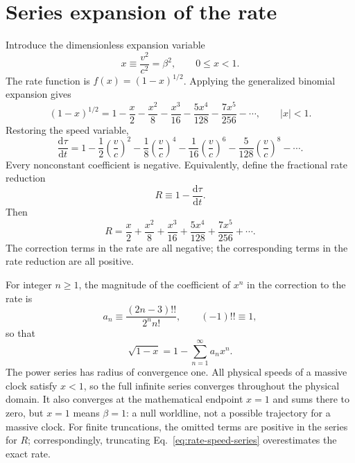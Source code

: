 \documentclass[12pt]{article}
\begin{document}
\section{Series expansion of the rate}

Introduce the dimensionless expansion variable
\begin{equation}
  x\equiv\frac{v^2}{c^2}=\beta^2,
  \qquad 0\leq x<1.
  \label{eq:x-definition}
\end{equation}
The rate function is $f(x)=(1-x)^{1/2}$. Applying the generalized binomial expansion \cite{DLMF} gives
\begin{equation}
  (1-x)^{1/2}
  =1-\frac{x}{2}-\frac{x^2}{8}-\frac{x^3}{16}
    -\frac{5x^4}{128}-\frac{7x^5}{256}-\cdots,
  \qquad |x|<1.
  \label{eq:rate-series}
\end{equation}
Restoring the speed variable,
\begin{equation}
  \frac{\mathrm{d}\tau}{\mathrm{d}t}
  =1-\frac{1}{2}\left(\frac{v}{c}\right)^2
    -\frac{1}{8}\left(\frac{v}{c}\right)^4
    -\frac{1}{16}\left(\frac{v}{c}\right)^6
    -\frac{5}{128}\left(\frac{v}{c}\right)^8-\cdots.
  \label{eq:rate-speed-series}
\end{equation}
Every nonconstant coefficient is negative. Equivalently, define the fractional rate reduction
\begin{equation}
  R\equiv1-\frac{\mathrm{d}\tau}{\mathrm{d}t}.
  \label{eq:rate-reduction}
\end{equation}
Then
\begin{equation}
  R=\frac{x}{2}+\frac{x^2}{8}+\frac{x^3}{16}
      +\frac{5x^4}{128}+\frac{7x^5}{256}+\cdots.
  \label{eq:reduction-series}
\end{equation}
The correction terms in the rate are all negative; the corresponding terms in the rate reduction are all positive.

For integer $n\geq1$, the magnitude of the coefficient of $x^n$ in the correction to the rate is
\begin{equation}
  a_n\equiv\frac{(2n-3)!!}{2^n n!},
  \qquad (-1)!!\equiv1,
  \label{eq:rate-coefficient}
\end{equation}
so that
\begin{equation}
  \sqrt{1-x}=1-\sum_{n=1}^{\infty}a_nx^n.
  \label{eq:rate-general-series}
\end{equation}
The power series has radius of convergence one. All physical speeds of a massive clock satisfy $x<1$, so the full infinite series converges throughout the physical domain. It also converges at the mathematical endpoint $x=1$ and sums there to zero, but $x=1$ means $\beta=1$: a null worldline, not a possible trajectory for a massive clock. For finite truncations, the omitted terms are positive in the series for $R$; correspondingly, truncating Eq.~\eqref{eq:rate-speed-series} overestimates the exact rate.
\end{document}
